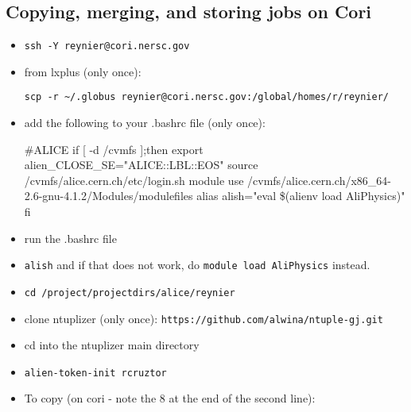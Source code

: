 \documentclass[12pt]{article}
\begin{document}
\subsection{Copying, merging, and storing jobs on Cori}

\begin{itemize}
\item \verb|ssh -Y |\color{olive}\verb|reynier|\color{black}\verb|@cori.nersc.gov|

\color{red}
\item from lxplus (only once):

\verb|scp -r ~/.globus |\color{olive}\verb|reynier|\color{black}\verb|@cori.nersc.gov:/global/homes/r/|\color{olive}\verb|reynier|\color{black}\verb|/|

\item add the following to your .bashrc file (only once):

\begin{tcolorbox}
\begin{verbnobox}[\scriptsize]
#ALICE
if [ -d /cvmfs ];then
        export alien_CLOSE_SE="ALICE::LBL::EOS"
        source /cvmfs/alice.cern.ch/etc/login.sh
        module use /cvmfs/alice.cern.ch/x86_64-2.6-gnu-4.1.2/Modules/modulefiles
        alias alish="eval \$(alienv load AliPhysics)"
fi
\end{verbnobox}  
\end{tcolorbox}

\color{black}

\item run the .bashrc file

\item \verb|alish| and if that does not work, do \verb|module load AliPhysics| instead.

\item \verb|cd /project/projectdirs/alice/|\color{olive}\verb|reynier|\color{black}

\color{red}
\item clone ntuplizer (only once): \verb|https://github.com/alwina/ntuple-gj.git|
\color{black}

\item cd into the ntuplizer main directory

\item \verb|alien-token-init |\color{olive}\verb|rcruztor|\color{black}

\item To copy (on cori - note the 8 at the end of the second line):


\end{itemize}
\end{document}
